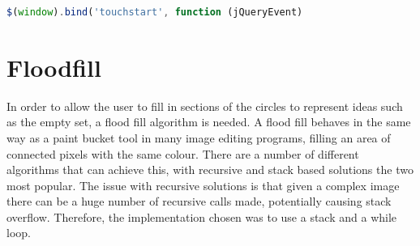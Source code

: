\documentclass[12pt,a4paper]{report}
\begin{document}
\begin{lstlisting}[language=JavaScript]
$(window).bind('touchstart', function (jQueryEvent)

\end{lstlisting}

\section{Floodfill}
In order to allow the user to fill in sections of the circles to represent ideas such as the empty set, a flood fill algorithm is needed. A flood fill behaves in the same way as a paint bucket tool in many image editing programs, filling an area of connected pixels with the same colour. There are a number of different algorithms that can achieve this, with recursive and stack based solutions the two most popular. The issue with recursive solutions is that given a complex image there can be a huge number of recursive calls made, potentially causing stack overflow. 
Therefore, the implementation chosen was to use a stack and a while loop.
\end{document}
